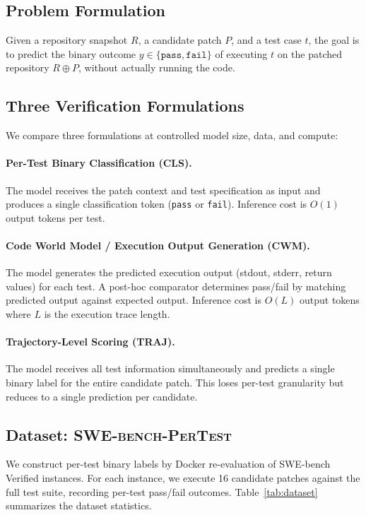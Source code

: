 \documentclass[11pt]{article}
\begin{document}
\subsection{Problem Formulation}

Given a repository snapshot $R$, a candidate patch $P$, and a test case $t$, the goal is to predict the binary outcome $y \in \{\texttt{pass}, \texttt{fail}\}$ of executing $t$ on the patched repository $R \oplus P$, without actually running the code.

\subsection{Three Verification Formulations}

We compare three formulations at controlled model size, data, and compute:

\paragraph{Per-Test Binary Classification (CLS).} The model receives the patch context and test specification as input and produces a single classification token (\texttt{pass} or \texttt{fail}). Inference cost is $O(1)$ output tokens per test.

\paragraph{Code World Model / Execution Output Generation (CWM).} The model generates the predicted execution output (stdout, stderr, return values) for each test. A post-hoc comparator determines pass/fail by matching predicted output against expected output. Inference cost is $O(L)$ output tokens where $L$ is the execution trace length.

\paragraph{Trajectory-Level Scoring (TRAJ).} The model receives all test information simultaneously and predicts a single binary label for the entire candidate patch. This loses per-test granularity but reduces to a single prediction per candidate.

\subsection{Dataset: \textsc{SWE-bench-PerTest}}
\label{sec:dataset}

We construct per-test binary labels by Docker re-evaluation of SWE-bench Verified instances. For each instance, we execute 16 candidate patches against the full test suite, recording per-test pass/fail outcomes. Table~\ref{tab:dataset} summarizes the dataset statistics.
\end{document}

